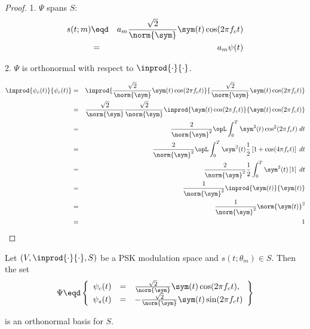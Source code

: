 \begin{proof}

1. $\Psi$ spans $S$:
\begin{eqnarray*}
   s(t;m) 
     &\eqd& a_m\frac{\sqrt{2}}{\norm{\sym}} \sym(t) \cos(2\pi f_c t) 
   \\&=&    a_m\psi(t)
\end{eqnarray*}

2. $\Psi$ is orthonormal with respect to $\inprod{\cdot}{\cdot}$.

\begin{eqnarray*}
   \inprod{\psi_c(t)}{\psi_c(t)}
      &=& \inprod{\frac{\sqrt{2}}{\norm{\sym}} \sym(t) \cos(2\pi f_c t)}
                 {\frac{\sqrt{2}}{\norm{\sym}} \sym(t) \cos(2\pi f_c t)}
    \\&=& \frac{\sqrt{2}}{\norm{\sym}}\frac{\sqrt{2}}{\norm{\sym}}
          \inprod{ \sym(t) \cos(2\pi f_c t)}
                 { \sym(t) \cos(2\pi f_c t)}
    \\&=& \frac{2}{\norm{\sym}^2}
          \opL
          \int_0^T \sym^2(t) \cos^2(2\pi f_c t) \; dt
    \\&=& \frac{2}{\norm{\sym}^2}
          \opL
          \int_0^T \sym^2(t)\frac{1}{2}\left[1+ \cos(4\pi f_c t)\right] \; dt
    \\&=& \frac{2}{\norm{\sym}^2}\frac{1}{2}
          \int_0^T \sym^2(t)\left[ 1 \right] \; dt
    \\&=& \frac{1}{\norm{\sym}^2}
          \inprod{\sym(t)}{\sym(t)}
    \\&=& \frac{1}{\norm{\sym}^2}
          \norm{\sym(t)}^2
    \\&=& 1
\end{eqnarray*}
\end{proof}




\begin{proposition}
\label{lem:psk_basis}
Let $(V, \inprod{\cdot}{\cdot}, S)$ be a PSK modulation space and 
$s(t;\theta_m)\in S$.
Then the set
\[
   \Psi \eqd \left\{ \begin{array}{rcl}
      \psi_c(t) &=& \frac{\sqrt{2}}{\norm{\sym}} \sym(t) \cos(2\pi f_c t), \\
      \psi_s(t) &=& -\frac{\sqrt{2}}{\norm{\sym}} \sym(t) \sin(2\pi f_c t)
      \end{array}\right\}
\]

is an orthonormal basis for $S$.
\end{proposition}

